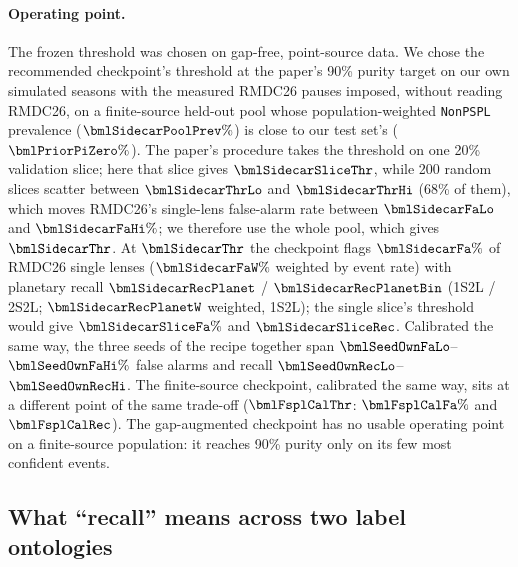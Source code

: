 \paragraph{Operating point.} The frozen threshold was chosen on gap-free, point-source data. We chose
the recommended checkpoint's threshold at the paper's 90\% purity target on our own simulated seasons
with the measured RMDC26 pauses imposed, without reading RMDC26, on a finite-source held-out pool whose
population-weighted \texttt{NonPSPL} prevalence ($\bmlSidecarPoolPrev\%$) is close to our test set's
($\bmlPriorPiZero\%$). The paper's procedure takes the threshold on one 20\% validation slice; here that
slice gives $\bmlSidecarSliceThr$, while 200 random slices scatter between $\bmlSidecarThrLo$ and
$\bmlSidecarThrHi$ (68\% of them), which moves RMDC26's single-lens false-alarm rate between
$\bmlSidecarFaLo$ and $\bmlSidecarFaHi\%$; we therefore use the whole pool, which gives $\bmlSidecarThr$.
At $\bmlSidecarThr$ the checkpoint flags $\bmlSidecarFa\%$ of RMDC26 single lenses ($\bmlSidecarFaW\%$
weighted by event rate) with planetary recall $\bmlSidecarRecPlanet$ /
$\bmlSidecarRecPlanetBin$ (1S2L / 2S2L; $\bmlSidecarRecPlanetW$ weighted, 1S2L); the single slice's
threshold would give $\bmlSidecarSliceFa\%$ and $\bmlSidecarSliceRec$. Calibrated the same way, the three
seeds of the recipe together span $\bmlSeedOwnFaLo$--$\bmlSeedOwnFaHi\%$ false alarms and recall
$\bmlSeedOwnRecLo$--$\bmlSeedOwnRecHi$. The finite-source checkpoint,
calibrated the same way, sits at a different point of the same trade-off ($\bmlFsplCalThr$:
$\bmlFsplCalFa\%$ and $\bmlFsplCalRec$). The gap-augmented checkpoint has no usable operating point on a
finite-source population: it reaches 90\% purity only on its few most confident events.

\subsection{What ``recall'' means across two label ontologies}\label{sec:gulls:labels}

